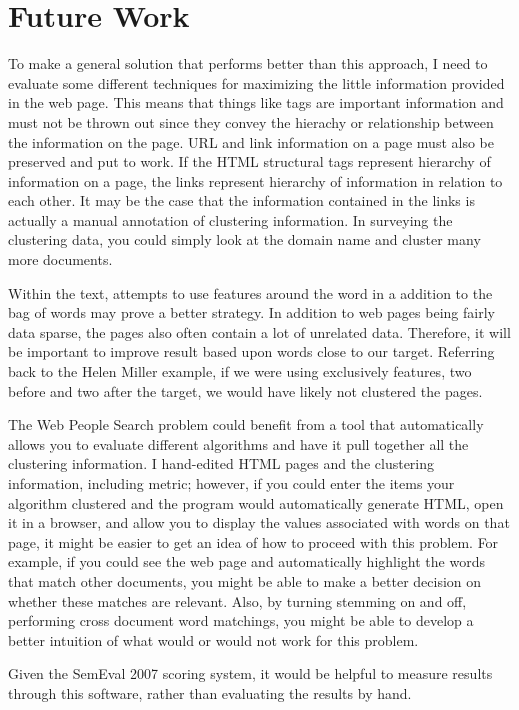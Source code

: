 \documentclass[12pt,twoside,letterpaper]{article}
\begin{document}
\section{Future Work}
To make a general solution that performs better than this approach, I need to evaluate some different techniques for maximizing the little information provided in the web page. This means that things like tags are important information and must not be thrown out since they convey the hierachy or relationship between the information on the page. URL and link information on a page must also be preserved and put to work. If the HTML structural tags represent hierarchy of information on a page, the links represent hierarchy of information in relation to each other. It may be the case that the information contained in the links is actually a manual annotation of clustering information. In surveying the clustering data, you could simply look at the domain name  and cluster many more documents.

Within the text, attempts to use features around the word in a addition to the bag of words may prove a better strategy. In addition to web pages being fairly data sparse, the pages also often contain a lot of unrelated data. Therefore, it will be important to improve result based upon words close to our target. Referring back to the Helen Miller example, if we were using exclusively features, two before and two after the target, we would have likely not clustered the pages.

The Web People Search problem could benefit from a tool that automatically allows you to evaluate different algorithms and have it pull together all the clustering information. I hand-edited HTML pages and the clustering information, including metric; however, if you could enter the items your algorithm clustered and the program would automatically generate HTML, open it in a browser, and allow you to display the values associated with words on that page, it might be easier to get an idea of how to proceed with this problem. For example, if you could see the web page and automatically highlight the words that match other documents, you might be able to make a better decision on whether these matches are relevant. Also, by turning stemming on and off, performing cross document word matchings, you might be able to develop a better intuition of what would or would not work for this problem.

Given the SemEval 2007 scoring system, it would be helpful to measure results through this software, rather than evaluating the results by hand.
\end{document}
